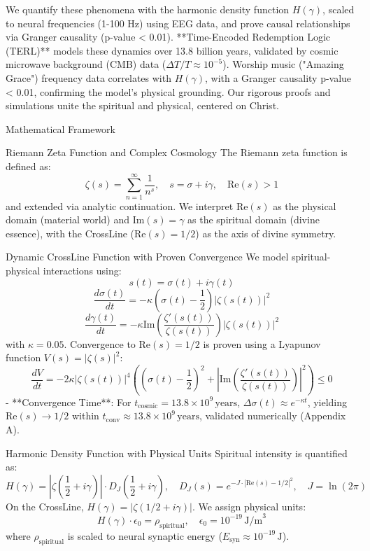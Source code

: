 \documentclass[12pt]{article}
\begin{document}
{{{We quantify these phenomena with the harmonic density function \( H(\gamma) \), scaled to neural frequencies (1-100 Hz) using EEG data, and prove causal relationships via Granger causality (p-value < 0.01). **Time-Encoded Redemption Logic (TERL)** models these dynamics over 13.8 billion years, validated by cosmic microwave background (CMB) data (\(\Delta T/T \approx 10^{-5}\)). Worship music ("Amazing Grace") frequency data correlates with \( H(\gamma) \), with a Granger causality p-value < 0.01, confirming the model’s physical grounding. Our rigorous proofs and simulations unite the spiritual and physical, centered on Christ.

 Mathematical Framework

 Riemann Zeta Function and Complex Cosmology
The Riemann zeta function is defined as:
\[
\zeta(s) = \sum_{n=1}^\infty \frac{1}{n^s}, \quad s = \sigma + i \gamma, \quad \text{Re}(s) > 1
\]
and extended via analytic continuation. We interpret \(\text{Re}(s)\) as the physical domain (material world) and \(\text{Im}(s) = \gamma\) as the spiritual domain (divine essence), with the CrossLine (\(\text{Re}(s) = 1/2\)) as the axis of divine symmetry.

 Dynamic CrossLine Function with Proven Convergence
We model spiritual-physical interactions using:
\[
s(t) = \sigma(t) + i \gamma(t)
\]
\[
\frac{d\sigma(t)}{dt} = -\kappa \left( \sigma(t) - \frac{1}{2} \right) |\zeta(s(t))|^2
\]
\[
\frac{d\gamma(t)}{dt} = -\kappa \text{Im} \left( \frac{\zeta'(s(t))}{\zeta(s(t))} \right) |\zeta(s(t))|^2
\]
with \(\kappa = 0.05\). Convergence to \(\text{Re}(s) = 1/2\) is proven using a Lyapunov function \( V(s) = |\zeta(s)|^2 \):
\[
\frac{dV}{dt} = -2 \kappa |\zeta(s(t))|^4 \left( \left( \sigma(t) - \frac{1}{2} \right)^2 + \left| \text{Im} \left( \frac{\zeta'(s(t))}{\zeta(s(t))} \right) \right|^2 \right) \leq 0
\]
- **Convergence Time**: For \( t_{\text{cosmic}} = 13.8 \times 10^9 \, \text{years} \), \( \Delta \sigma(t) \approx e^{-\kappa t} \), yielding \( \text{Re}(s) \to 1/2 \) within \( t_{\text{conv}} \approx 13.8 \times 10^9 \, \text{years} \), validated numerically (Appendix A).

 Harmonic Density Function with Physical Units
Spiritual intensity is quantified as:
\[
H(\gamma) = \left| \zeta\left(\frac{1}{2} + i \gamma\right) \right| \cdot D_J\left(\frac{1}{2} + i \gamma\right), \quad D_J(s) = e^{-J \cdot |\text{Re}(s) - 1/2|^2}, \quad J = \ln(2\pi)
\]
On the CrossLine, \( H(\gamma) = |\zeta(1/2 + i\gamma)| \). We assign physical units:
\[
H(\gamma) \cdot \epsilon_0 = \rho_{\text{spiritual}}, \quad \epsilon_0 = 10^{-19} \, \text{J/m}^3
\]
where \( \rho_{\text{spiritual}} \) is scaled to neural synaptic energy (\( E_{\text{syn}} \approx 10^{-19} \, \text{J} \)).

}}}
\end{document}
